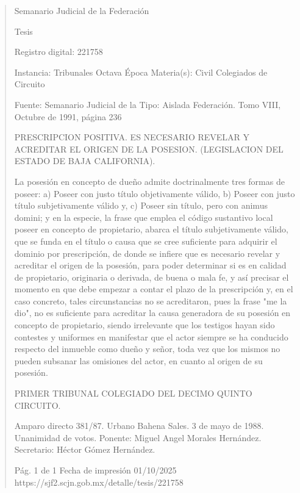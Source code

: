 \documentclass[11pt,a4paper]{article}
\begin{document}
\begin{quote}
                                                   Semanario Judicial de la Federación

                                                  Tesis

 Registro digital: 221758

 Instancia: Tribunales            Octava Época                          Materia(s): Civil
 Colegiados de Circuito

                                  Fuente: Semanario Judicial de la   Tipo: Aislada
                                  Federación.
                                  Tomo VIII, Octubre de 1991, página
                                  236


PRESCRIPCION POSITIVA. ES NECESARIO REVELAR Y ACREDITAR EL ORIGEN DE LA
POSESION. (LEGISLACION DEL ESTADO DE BAJA CALIFORNIA).


La posesión en concepto de dueño admite doctrinalmente tres formas de poseer: a) Poseer con
justo título objetivamente válido, b) Poseer con justo título subjetivamente válido y, c) Poseer sin
título, pero con animus domini; y en la especie, la frase que emplea el código sustantivo local
poseer en concepto de propietario, abarca el título subjetivamente válido, que se funda en el título o
causa que se cree suficiente para adquirir el dominio por prescripción, de donde se infiere que es
necesario revelar y acreditar el origen de la posesión, para poder determinar si es en calidad de
propietario, originaria o derivada, de buena o mala fe, y así precisar el momento en que debe
empezar a contar el plazo de la prescripción y, en el caso concreto, tales circunstancias no se
acreditaron, pues la frase "me la dio", no es suficiente para acreditar la causa generadora de su
posesión en concepto de propietario, siendo irrelevante que los testigos hayan sido contestes y
uniformes en manifestar que el actor siempre se ha conducido respecto del inmueble como dueño y
señor, toda vez que los mismos no pueden subsanar las omisiones del actor, en cuanto al origen de
su posesión.

PRIMER TRIBUNAL COLEGIADO DEL DECIMO QUINTO CIRCUITO.


Amparo directo 381/87. Urbano Bahena Sales. 3 de mayo de 1988. Unanimidad de votos. Ponente:
Miguel Angel Morales Hernández. Secretario: Héctor Gómez Hernández.




                                             Pág. 1 de 1             Fecha de impresión 01/10/2025
  https://sjf2.scjn.gob.mx/detalle/tesis/221758

\end{quote}
\end{document}
